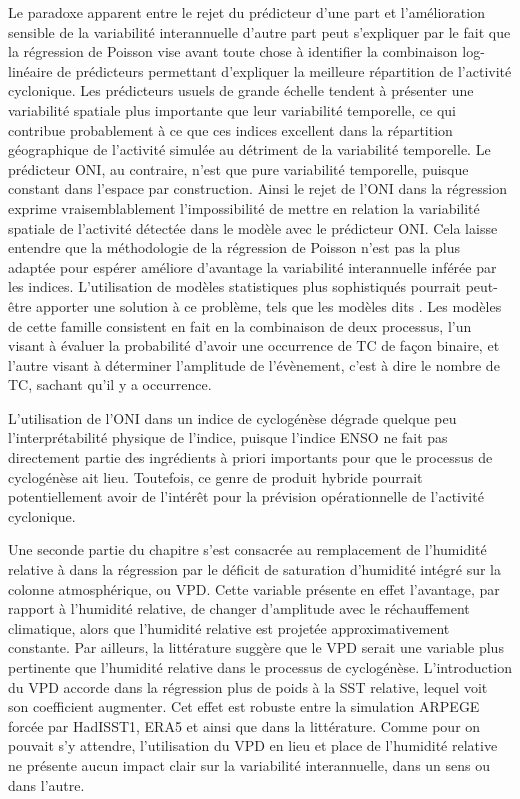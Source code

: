 \documentclass[../main.tex]{subfiles}
\begin{document}
Le paradoxe apparent entre le rejet du prédicteur d'une part et l'amélioration sensible de la variabilité interannuelle d'autre part peut s'expliquer par le
fait que la régression de Poisson vise avant toute chose à identifier la combinaison log-linéaire de prédicteurs permettant d'expliquer la meilleure répartition
de l'activité cyclonique. Les prédicteurs usuels de grande échelle tendent à présenter une variabilité spatiale plus importante que leur variabilité temporelle,
ce qui contribue probablement à ce que ces indices excellent dans la répartition géographique de l'activité simulée au détriment de la variabilité temporelle.
Le prédicteur ONI, au contraire, n'est que pure variabilité temporelle, puisque constant dans l'espace par construction. Ainsi le rejet de l'ONI dans la
régression exprime vraisemblablement l'impossibilité de mettre en relation la variabilité spatiale de l'activité détectée dans le modèle avec le prédicteur ONI.
Cela laisse entendre que la méthodologie de la régression de Poisson n'est pas la plus adaptée pour espérer améliore d'avantage la variabilité interannuelle
inférée par les indices. L'utilisation de modèles statistiques plus sophistiqués pourrait peut-être apporter une solution à ce problème, tels que les modèles
dits . Les modèles de cette famille consistent en fait en la combinaison de deux processus, l'un visant à évaluer la probabilité d'avoir une
occurrence de TC de façon binaire, et l'autre visant à déterminer l'amplitude de l'évènement, c'est à dire le nombre de TC, sachant qu'il y a occurrence.

L'utilisation de l'ONI dans un indice de cyclogénèse dégrade quelque peu l'interprétabilité physique de l'indice, puisque l'indice ENSO ne fait pas directement
partie des ingrédients à priori importants pour que le processus de cyclogénèse ait lieu. Toutefois, ce genre de produit hybride pourrait potentiellement avoir
de l'intérêt pour la prévision opérationnelle de l'activité cyclonique.

Une seconde partie du chapitre s'est consacrée au remplacement de l'humidité relative à  dans la régression par le déficit de saturation d'humidité
intégré sur la colonne atmosphérique, ou VPD. Cette variable présente en effet l'avantage, par rapport à l'humidité relative, de changer d'amplitude avec le
réchauffement climatique, alors que l'humidité relative est projetée approximativement constante. Par ailleurs, la littérature suggère que le VPD serait une
variable plus pertinente que l'humidité relative dans le processus de cyclogénèse. L'introduction du VPD accorde dans la régression plus de poids à la SST
relative, lequel voit son coefficient augmenter. Cet effet est robuste entre la simulation ARPEGE forcée par HadISST1, ERA5 et ainsi que dans la littérature.
Comme pour on pouvait s'y attendre, l'utilisation du VPD en lieu et place de l'humidité relative ne présente aucun impact clair sur la variabilité interannuelle,
dans un sens ou dans l'autre.
\end{document}
